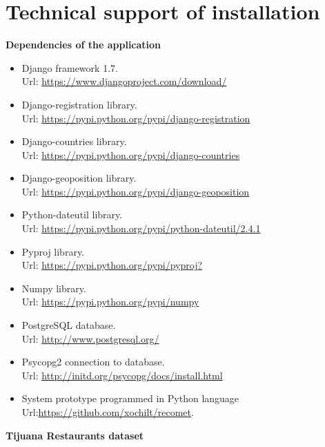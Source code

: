 \chapter{Technical support of installation}\label{appendixc}
\textbf{\large{Dependencies of the application}}
\begin{itemize}
\item Django framework 1.7.\\ Url: 
\url{https://www.djangoproject.com/download/}
\item Django-registration library. \\
Url: \url{https://pypi.python.org/pypi/django-registration}
\item Django-countries library. \\
Url: \url{https://pypi.python.org/pypi/django-countries}
\item Django-geoposition library. \\
Url: \url{https://pypi.python.org/pypi/django-geoposition}
\item Python-dateutil library. \\
Url: \url{https://pypi.python.org/pypi/python-dateutil/2.4.1}
\item Pyproj library. \\
Url: \url{https://pypi.python.org/pypi/pyproj?}
\item Numpy library. \\
Url: \url{https://pypi.python.org/pypi/numpy}
\item PostgreSQL database. 
\\Url: \url{http://www.postgresql.org/}
\item Psycopg2 connection to database. \\
Url: \url{http://initd.org/psycopg/docs/install.html}
\item System prototype programmed in Python language 
Url:\url{https://github.com/xochilt/recomet}.
\end{itemize}
\textbf{\large{Tijuana Restaurants dataset}}

